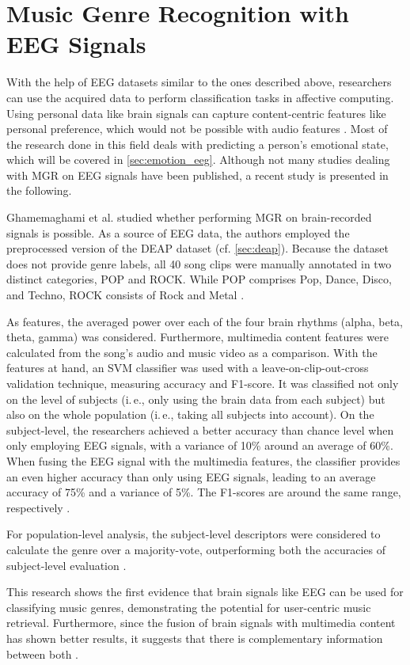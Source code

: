   \section{Music Genre Recognition with EEG Signals} \label{sec:genre_eeg}
    With the help of \ac{EEG} datasets similar to the ones described above, researchers can use the acquired data to perform classification tasks in affective computing. Using personal data like brain signals can capture content-centric features like personal preference, which would not be possible with audio features \cite{ghaemmaghami2016brain}. Most of the research done in this field deals with predicting a person's emotional state, which will be covered in \autoref{sec:emotion_eeg}. Although not many studies dealing with \ac{MGR} on \ac{EEG} signals have been published, a recent study is presented in the following. \par
    Ghamemaghami et al. studied whether performing \ac{MGR} on brain-recorded signals is possible. As a source of \ac{EEG} data, the authors employed the preprocessed version of the \ac{DEAP} dataset (cf. \autoref{sec:deap}). Because the dataset does not provide genre labels, all 40 song clips were manually annotated in two distinct categories, POP and ROCK. While POP comprises Pop, Dance, Disco, and Techno, ROCK consists of Rock and Metal \cite{ghaemmaghami2016brain}. \par
    As features, the averaged power over each of the four brain rhythms (alpha, beta, theta, gamma) was considered. Furthermore, multimedia content features were calculated from the song's audio and music video as a comparison. With the features at hand, an \ac{SVM} classifier was used with a leave-on-clip-out-cross validation technique, measuring accuracy and F1-score. It was classified not only on the level of subjects (i.\,e., only using the brain data from each subject) but also on the whole population (i.\,e., taking all subjects into account). On the subject-level, the researchers achieved a better accuracy than chance level when only employing \ac{EEG} signals, with a variance of 10\% around an average of 60\%. When fusing the \ac{EEG} signal with the multimedia features, the classifier provides an even higher accuracy than only using \ac{EEG} signals, leading to an average accuracy of 75\% and a variance of 5\%. The F1-scores are around the same range, respectively \cite{ghaemmaghami2016brain}. \par
    For population-level analysis, the subject-level descriptors were considered to calculate the genre over a majority-vote, outperforming both the accuracies of subject-level evaluation \cite{ghaemmaghami2016brain}. \par
    This research shows the first evidence that brain signals like \ac{EEG} can be used for classifying music genres, demonstrating the potential for user-centric music retrieval. Furthermore, since the fusion of brain signals with multimedia content has shown better results, it suggests that there is complementary information between both \cite{ghaemmaghami2016brain}.\par
